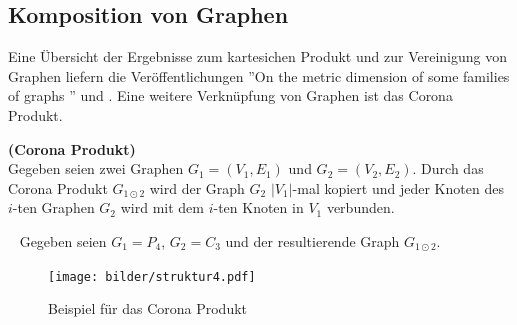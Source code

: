 \subsection{Komposition von Graphen}
Eine Übersicht der Ergebnisse zum kartesichen Produkt und zur Vereinigung von Graphen liefern die Veröffentlichungen ''On the metric dimension of some families of graphs
''\cite{families} und \cite{}. Eine weitere Verknüpfung von Graphen ist das Corona Produkt.

\begin{defi}{\textbf{(Corona Produkt)}}\\
Gegeben seien zwei Graphen $G_1=(V_1,E_1)$ und $G_2=(V_2,E_2)$. Durch das Corona Produkt $G_{1 \odot 2}$ wird der Graph $G_2$ $|V_1|$-mal kopiert und jeder Knoten des $i$-ten Graphen $G_2$ wird mit dem $i$-ten Knoten in $V_1$ verbunden.
\end{defi}
\begin{bsp} ~ \newline
Gegeben seien $G_1=P_4$, $G_2=C_3$ und der resultierende Graph $G_{1 \odot 2}$.\newline
\vspace{-1mm}
\begin{figure}[ht]
		\centering 		 
   \texttt{[image: bilder/struktur4.pdf]}
	\caption{Beispiel für das Corona Produkt}
  	 \label{bild:vereinigung}
  	 \end{figure}
  	 \vspace{-7mm}
  	 ~\linebreak
\end{bsp}
